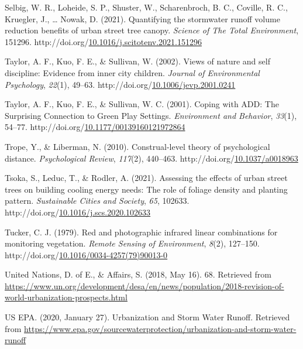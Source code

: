 \documentclass[12pt,twoside]{reedthesis}
\newlength{\cslhangindent}
\newenvironment{CSLReferences}[2] %
 {%
  \setlength{\parindent}{0pt}
  \ifodd #1 \everypar{\setlength{\hangindent}{\cslhangindent}}\ignorespaces\fi
  \ifnum #2 > 0
  \setlength{\parskip}{#2\baselineskip}
  \fi
 }%
 {}
\begin{document}
\begin{CSLReferences}{1}{0}
\leavevmode{}%
Selbig, W. R., Loheide, S. P., Shuster, W., Scharenbroch, B. C., Coville, R. C., Kruegler, J., \ldots{} Nowak, D. (2021). Quantifying the stormwater runoff volume reduction benefits of urban street tree canopy. \emph{Science of The Total Environment}, 151296. http://doi.org/\href{https://doi.org/10.1016/j.scitotenv.2021.151296}{10.1016/j.scitotenv.2021.151296}

\leavevmode{}%
Taylor, A. F., Kuo, F. E., \& Sullivan, W. (2002). Views of nature and self discipline: Evidence from inner city children. \emph{Journal of Environmental Psychology}, \emph{22}(1), 49--63. http://doi.org/\href{https://doi.org/10.1006/jevp.2001.0241}{10.1006/jevp.2001.0241}

\leavevmode{}%
Taylor, A. F., Kuo, F. E., \& Sullivan, W. C. (2001). Coping with ADD: The Surprising Connection to Green Play Settings. \emph{Environment and Behavior}, \emph{33}(1), 54--77. http://doi.org/\href{https://doi.org/10.1177/00139160121972864}{10.1177/00139160121972864}

\leavevmode{}%
Trope, Y., \& Liberman, N. (2010). Construal-level theory of psychological distance. \emph{Psychological Review}, \emph{117}(2), 440--463. http://doi.org/\href{https://doi.org/10.1037/a0018963}{10.1037/a0018963}

\leavevmode{}%
Tsoka, S., Leduc, T., \& Rodler, A. (2021). Assessing the effects of urban street trees on building cooling energy needs: The role of foliage density and planting pattern. \emph{Sustainable Cities and Society}, \emph{65}, 102633. http://doi.org/\href{https://doi.org/10.1016/j.scs.2020.102633}{10.1016/j.scs.2020.102633}

\leavevmode{}%
Tucker, C. J. (1979). Red and photographic infrared linear combinations for monitoring vegetation. \emph{Remote Sensing of Environment}, \emph{8}(2), 127--150. http://doi.org/\href{https://doi.org/10.1016/0034-4257(79)90013-0}{10.1016/0034-4257(79)90013-0}

\leavevmode{}%
United Nations, D. of E., \& Affairs, S. (2018, May 16). 68. Retrieved from \url{https://www.un.org/development/desa/en/news/population/2018-revision-of-world-urbanization-prospects.html}

\leavevmode{}%
US EPA. (2020, January 27). Urbanization and Storm Water Runoff. Retrieved from \url{https://www.epa.gov/sourcewaterprotection/urbanization-and-storm-water-runoff}


\end{CSLReferences}
\end{document}

